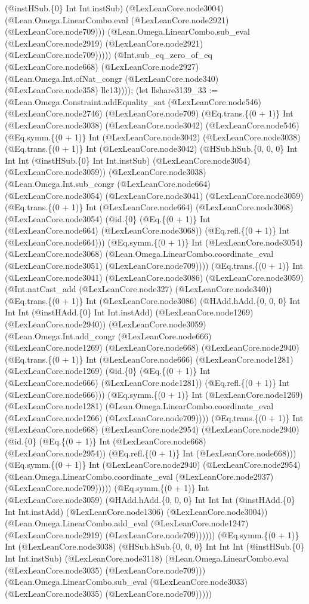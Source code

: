 \documentclass[11pt]{article}
\begin{document}
(@instHSub.\{0\} Int Int.instSub) (@LexLeanCore.node3004) (@Lean.Omega.LinearCombo.eval (@LexLeanCore.node2921) (@LexLeanCore.node709))) (@Lean.Omega.LinearCombo.sub\_eval (@LexLeanCore.node2919) (@LexLeanCore.node2921) (@LexLeanCore.node709))))) (@Int.sub\_eq\_zero\_of\_eq (@LexLeanCore.node668) (@LexLeanCore.node2927) (@Lean.Omega.Int.ofNat\_congr (@LexLeanCore.node340) (@LexLeanCore.node358) llc13)))); (let llshare3139\_33 := (@Lean.Omega.Constraint.addEquality\_sat (@LexLeanCore.node546) (@LexLeanCore.node2746) (@LexLeanCore.node709) (@Eq.trans.\{(0 + 1)\} Int (@LexLeanCore.node3038) (@LexLeanCore.node3042) (@LexLeanCore.node546) (@Eq.symm.\{(0 + 1)\} Int (@LexLeanCore.node3042) (@LexLeanCore.node3038) (@Eq.trans.\{(0 + 1)\} Int (@LexLeanCore.node3042) (@HSub.hSub.\{0, 0, 0\} Int Int Int (@instHSub.\{0\} Int Int.instSub) (@LexLeanCore.node3054) (@LexLeanCore.node3059)) (@LexLeanCore.node3038) (@Lean.Omega.Int.sub\_congr (@LexLeanCore.node664) (@LexLeanCore.node3054) (@LexLeanCore.node3041) (@LexLeanCore.node3059) (@Eq.trans.\{(0 + 1)\} Int (@LexLeanCore.node664) (@LexLeanCore.node3068) (@LexLeanCore.node3054) (@id.\{0\} (@Eq.\{(0 + 1)\} Int (@LexLeanCore.node664) (@LexLeanCore.node3068)) (@Eq.refl.\{(0 + 1)\} Int (@LexLeanCore.node664))) (@Eq.symm.\{(0 + 1)\} Int (@LexLeanCore.node3054) (@LexLeanCore.node3068) (@Lean.Omega.LinearCombo.coordinate\_eval (@LexLeanCore.node3051) (@LexLeanCore.node709)))) (@Eq.trans.\{(0 + 1)\} Int (@LexLeanCore.node3041) (@LexLeanCore.node3086) (@LexLeanCore.node3059) (@Int.natCast\_add (@LexLeanCore.node327) (@LexLeanCore.node340)) (@Eq.trans.\{(0 + 1)\} Int (@LexLeanCore.node3086) (@HAdd.hAdd.\{0, 0, 0\} Int Int Int (@instHAdd.\{0\} Int Int.instAdd) (@LexLeanCore.node1269) (@LexLeanCore.node2940)) (@LexLeanCore.node3059) (@Lean.Omega.Int.add\_congr (@LexLeanCore.node666) (@LexLeanCore.node1269) (@LexLeanCore.node668) (@LexLeanCore.node2940) (@Eq.trans.\{(0 + 1)\} Int (@LexLeanCore.node666) (@LexLeanCore.node1281) (@LexLeanCore.node1269) (@id.\{0\} (@Eq.\{(0 + 1)\} Int (@LexLeanCore.node666) (@LexLeanCore.node1281)) (@Eq.refl.\{(0 + 1)\} Int (@LexLeanCore.node666))) (@Eq.symm.\{(0 + 1)\} Int (@LexLeanCore.node1269) (@LexLeanCore.node1281) (@Lean.Omega.LinearCombo.coordinate\_eval (@LexLeanCore.node1266) (@LexLeanCore.node709)))) (@Eq.trans.\{(0 + 1)\} Int (@LexLeanCore.node668) (@LexLeanCore.node2954) (@LexLeanCore.node2940) (@id.\{0\} (@Eq.\{(0 + 1)\} Int (@LexLeanCore.node668) (@LexLeanCore.node2954)) (@Eq.refl.\{(0 + 1)\} Int (@LexLeanCore.node668))) (@Eq.symm.\{(0 + 1)\} Int (@LexLeanCore.node2940) (@LexLeanCore.node2954) (@Lean.Omega.LinearCombo.coordinate\_eval (@LexLeanCore.node2937) (@LexLeanCore.node709))))) (@Eq.symm.\{(0 + 1)\} Int (@LexLeanCore.node3059) (@HAdd.hAdd.\{0, 0, 0\} Int Int Int (@instHAdd.\{0\} Int Int.instAdd) (@LexLeanCore.node1306) (@LexLeanCore.node3004)) (@Lean.Omega.LinearCombo.add\_eval (@LexLeanCore.node1247) (@LexLeanCore.node2919) (@LexLeanCore.node709)))))) (@Eq.symm.\{(0 + 1)\} Int (@LexLeanCore.node3038) (@HSub.hSub.\{0, 0, 0\} Int Int Int (@instHSub.\{0\} Int Int.instSub) (@LexLeanCore.node3118) (@Lean.Omega.LinearCombo.eval (@LexLeanCore.node3035) (@LexLeanCore.node709))) (@Lean.Omega.LinearCombo.sub\_eval (@LexLeanCore.node3033) (@LexLeanCore.node3035) (@LexLeanCore.node709))))) 
\end{document}

